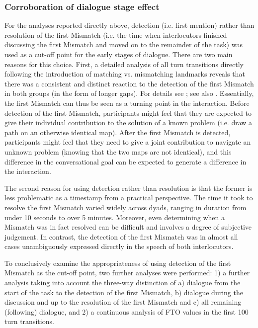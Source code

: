\subsubsection{Corroboration of dialogue stage effect}\label{turntaking_results_FTO_stage_corroboration}


For the analyses reported directly above, detection (i.e. first mention) rather than resolution of the first Mismatch (i.e. the time when interlocutors finished discussing the first Mismatch and moved on to the remainder of the task) was used as a cut-off point for the early stages of dialogue. There are two main reasons for this choice. First, a detailed analysis of all turn transitions directly following the introduction of matching vs. mismatching landmarks reveals that there was a consistent and distinct reaction to the detection of the first Mismatch in both groups (in the form of longer gaps). For details see ; see also \citet{janzTurnTransitionsSpectrumConversational2019}. Essentially, the first Mismatch can thus be seen as a turning point in the interaction. Before detection of the first Mismatch, participants might feel that they are expected to give their individual contribution to the solution of a known problem (i.e. draw a path on an otherwise identical map). After the first Mismatch is detected, participants might feel that they need to give a joint contribution to navigate an unknown problem (knowing that the two maps are not identical), and this difference in the conversational goal can be expected to generate a difference in the interaction.

The second reason for using detection rather than resolution is that the former is less problematic as a timestamp from a practical perspective. The time it took to resolve the first Mismatch varied widely across dyads, ranging in duration from under 10 seconds to over 5 minutes. Moreover, even determining when a Mismatch was in fact resolved can be difficult and involves a degree of subjective judgement. In contrast, the detection of the first Mismatch was in almost all cases unambiguously expressed directly in the speech of both interlocutors.

To conclusively examine the appropriateness of using detection of the first Mismatch as the cut-off point, two further analyses were performed: 1) a further analysis taking into account the three-way distinction of a) dialogue from the start of the task to the detection of the first Mismatch, b) dialogue during the discussion and up to the resolution of the first Mismatch and c) all remaining (following) dialogue, and 2) a continuous analysis of FTO values in the first 100 turn transitions.

